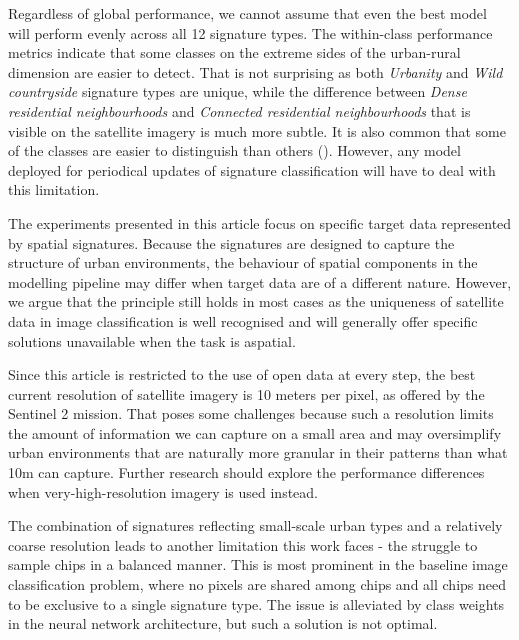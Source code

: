 Regardless of global performance, we cannot assume that even the best model will perform evenly across all 12
signature types. The within-class performance metrics indicate that some classes on the
extreme sides of the urban-rural dimension are easier to detect. That is not surprising
as both \textit{Urbanity} and \textit{Wild countryside} signature types are unique,
while the difference between \textit{Dense residential neighbourhoods} and
\textit{Connected residential neighbourhoods} that is visible on the satellite imagery
is much more subtle. It is also common that some of the classes are easier to
distinguish than others (\cite{zanaga_daniele_2021_5571936, karra2021global}). However,
any model deployed for periodical updates of signature classification will have to deal
with this limitation.

The experiments presented in this article focus on specific target data represented by
spatial signatures. Because the signatures are designed to capture the structure of urban
environments, the behaviour of spatial components in the modelling pipeline may differ
when target data are of a different nature. However, we argue that the
principle still holds in most cases as the uniqueness of satellite data in image
classification is well recognised and will generally offer specific solutions unavailable when the task is aspatial.

Since this article is restricted to the use of open data at every step, the best current
resolution of satellite imagery is 10 meters per pixel, as offered by the Sentinel 2
mission. That poses some challenges because such a resolution limits the amount of
information we can capture on a small area and may oversimplify urban environments that
are naturally more granular in their patterns than what 10m can capture. Further
research should explore the performance differences when very-high-resolution
imagery is used instead.

The combination of signatures reflecting small-scale urban types and a relatively coarse
resolution leads to another limitation this work faces - the struggle to sample chips
in a balanced manner. This is most prominent in the baseline image classification
problem, where no pixels are shared among chips and all chips need to be exclusive to a
single signature type. The issue is alleviated by class weights in the neural network
architecture, but such a solution is not optimal.

